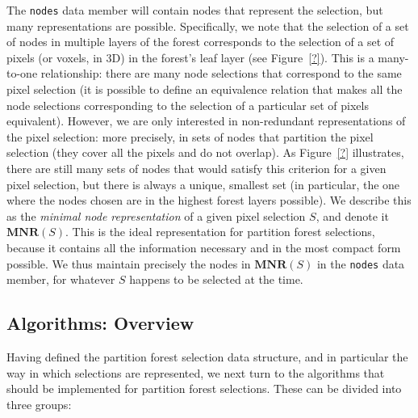 The \texttt{nodes} data member will contain nodes that represent the selection, but many representations are possible. Specifically, we note that the selection of a set of nodes in multiple layers of the forest corresponds to the selection of a set of pixels (or voxels, in 3D) in the forest's leaf layer (see Figure~\ref{?}). This is a many-to-one relationship: there are many node selections that correspond to the same pixel selection (it is possible to define an equivalence relation that makes all the node selections corresponding to the selection of a particular set of pixels equivalent). However, we are only interested in non-redundant representations of the pixel selection: more precisely, in sets of nodes that partition the pixel selection (they cover all the pixels and do not overlap). As Figure~\ref{?} illustrates, there are still many sets of nodes that would satisfy this criterion for a given pixel selection, but there is always a unique, smallest set (in particular, the one where the nodes chosen are in the highest forest layers possible). We describe this as the \emph{minimal node representation} of a given pixel selection $S$, and denote it $\textbf{MNR}(S)$. This is the ideal representation for partition forest selections, because it contains all the information necessary and in the most compact form possible. We thus maintain precisely the nodes in $\textbf{MNR}(S)$ in the \texttt{nodes} data member, for whatever $S$ happens to be selected at the time.

\subsection{Algorithms: Overview}

Having defined the partition forest selection data structure, and in particular the way in which selections are represented, we next turn to the algorithms that should be implemented for partition forest selections. These can be divided into three groups:

